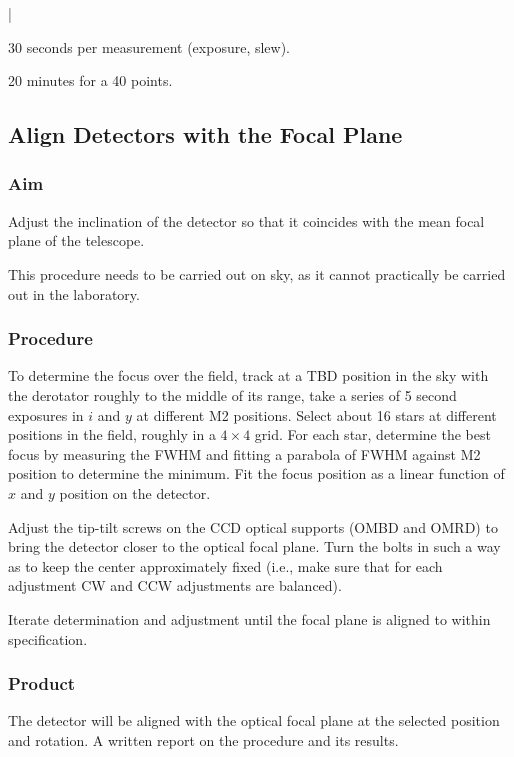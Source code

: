 |\documentclass{article}
\begin{document}
30 seconds per measurement (exposure, slew).

20 minutes for a 40 points.


\subsection{Align Detectors with the Focal Plane}

\subsubsection{Aim}

Adjust the inclination of the detector so that it coincides with the mean focal plane of the telescope.

This procedure needs to be carried out on sky, as it cannot practically be carried out in the laboratory.

\subsubsection{Procedure}

To determine the focus over the field, track at a TBD position in the sky with the derotator roughly to the middle of its range, take a series of 5 second exposures in $i$ and $y$ at different M2 positions. Select about 16 stars at different positions in the field, roughly in a $4\times4$ grid. For each star, determine the best focus by measuring the FWHM and fitting a parabola of FWHM against M2 position to determine the minimum. Fit the focus position as a linear function of $x$ and $y$ position on the detector.

Adjust the tip-tilt screws on the CCD optical supports (OMBD and OMRD) to bring the detector closer to the optical focal plane. Turn the bolts in such a way as to keep the center approximately fixed (i.e., make sure that for each adjustment CW and CCW adjustments are balanced).

Iterate determination and adjustment until the focal plane is aligned to within specification.

\subsubsection{Product}

The detector will be aligned with the optical focal plane at the selected position and rotation. A written report on the procedure and its results.
\end{document}
